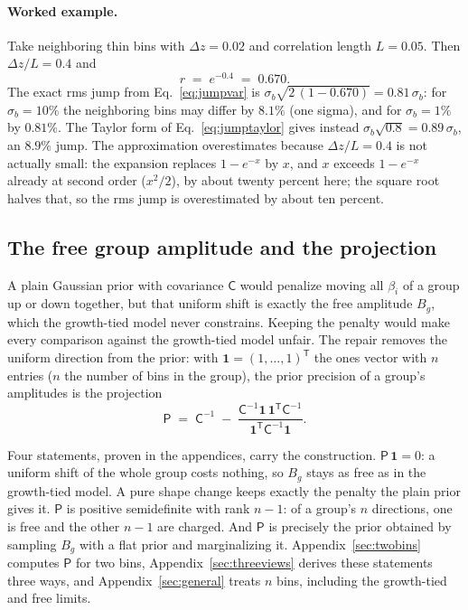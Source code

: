 \documentclass[11pt]{article}
\newcommand{\ones}{\mathbf{1}} %
\newcommand{\Cov}{\mathsf{C}}
\newcommand{\Prec}{\mathsf{P}}
\newcommand{\T}{^{\mathsf{T}}}
\begin{document}
\paragraph{Worked example.}
Take neighboring thin bins with $\Delta z = 0.02$ and correlation
length $L = 0.05$.  Then $\Delta z / L = 0.4$ and
\begin{equation}
  r \;=\; e^{-0.4} \;=\; 0.670 .
  \label{eq:workedr}
\end{equation}
The exact rms jump from Eq.~\eqref{eq:jumpvar} is
$\sigma_b \sqrt{2\,(1 - 0.670)} = 0.81\,\sigma_b$: for
$\sigma_b = 10\%$ the neighboring bins may differ by $8.1\%$ (one
sigma), and for $\sigma_b = 1\%$ by $0.81\%$.  The Taylor form of
Eq.~\eqref{eq:jumptaylor} gives instead
$\sigma_b \sqrt{0.8} = 0.89\,\sigma_b$, an $8.9\%$ jump.  The
approximation overestimates because $\Delta z / L = 0.4$ is not
actually small: the expansion replaces $1 - e^{-x}$ by $x$, and
$x$ exceeds $1 - e^{-x}$ already at second order ($x^2/2$), by about
twenty percent here; the square root halves that, so the rms jump is
overestimated by about ten percent.

\subsection{The free group amplitude and the projection}
\label{sec:projintro}

A plain Gaussian prior with covariance $\Cov$ would penalize moving
all $\beta_i$ of a group up or down together, but that uniform shift
is exactly the free amplitude $B_g$, which the growth-tied model never
constrains.  Keeping the penalty would make every comparison against
the growth-tied model unfair.  The repair removes the uniform direction from
the prior: with $\ones = (1, \dots, 1)\T$ the ones vector with $n$
entries ($n$ the number of bins in the group), the prior precision of
a group's amplitudes is the projection
\begin{equation}
  \Prec \;=\; \Cov^{-1}
  \;-\;
  \frac{\Cov^{-1}\ones\,\ones\T \Cov^{-1}}{\ones\T \Cov^{-1} \ones}.
  \label{eq:projdef}
\end{equation}

Four statements, proven in the appendices, carry the construction.
$\Prec\,\ones = 0$: a uniform shift of the whole group costs nothing,
so $B_g$ stays as free as in the growth-tied model.  A pure shape change
keeps exactly the penalty the plain prior gives it.  $\Prec$ is
positive semidefinite with rank $n - 1$: of a group's $n$ directions,
one is free and the other $n - 1$ are charged.  And $\Prec$ is
precisely the prior obtained by sampling $B_g$ with a flat prior and
marginalizing it.  Appendix~\ref{sec:twobins} computes $\Prec$ for two
bins, Appendix~\ref{sec:threeviews} derives these statements three
ways, and Appendix~\ref{sec:general} treats $n$ bins, including the
growth-tied and free limits.
\end{document}

